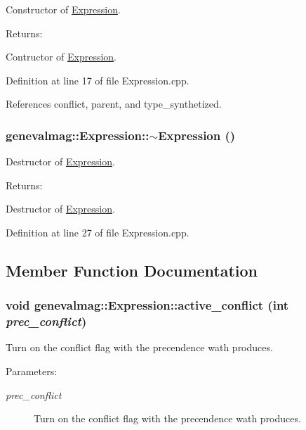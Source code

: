 Constructor of \hyperlink{classgenevalmag_1_1Expression}{Expression}. \begin{Desc}
\item[Returns:]\end{Desc}
Contructor of \hyperlink{classgenevalmag_1_1Expression}{Expression}. 

Definition at line 17 of file Expression.cpp.

References conflict, parent, and type\_\-synthetized.\hypertarget{classgenevalmag_1_1Expression_9ab15992e6a819e8e683745069bcf15b}{
\subsubsection[{$\sim$Expression}]{\setlength{\rightskip}{0pt plus 5cm}genevalmag::Expression::$\sim$Expression ()}}
\label{classgenevalmag_1_1Expression_9ab15992e6a819e8e683745069bcf15b}


Destructor of \hyperlink{classgenevalmag_1_1Expression}{Expression}. \begin{Desc}
\item[Returns:]\end{Desc}
Destructor of \hyperlink{classgenevalmag_1_1Expression}{Expression}. 

Definition at line 27 of file Expression.cpp.

\subsection{Member Function Documentation}
\hypertarget{classgenevalmag_1_1Expression_6c1265f335e85346c23556cc361c4aad}{
\subsubsection[{active\_\-conflict}]{\setlength{\rightskip}{0pt plus 5cm}void genevalmag::Expression::active\_\-conflict (int {\em prec\_\-conflict})}}
\label{classgenevalmag_1_1Expression_6c1265f335e85346c23556cc361c4aad}


Turn on the conflict flag with the precendence wath produces. \begin{Desc}
\item[Parameters:]
\begin{description}
\item[{\em prec\_\-conflict}]Turn on the conflict flag with the precendence wath produces. \end{description}
\end{Desc}


